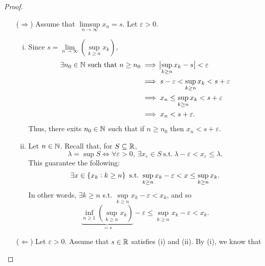 \documentclass[11pt,openany]{article}
\begin{document}
\begin{proof}
\begin{enumerate}[(1)]
\begin{center}
\end{center}
\begin{itemize}
	\item[($\Rightarrow$)] Assume that $\limsup\limits_{n \to \infty} x_n=s$. Let $\varepsilon>0$. 
	\begin{enumerate}[(i)]
		\item Since $s=\lim\limits_{n\to\infty}\left(\sup\limits_{k\geq n}x_k\right)$, 
		\begin{align*}
		\exists n_0\in\mathbb{N}\ \text{such that}\ n\geq n_0&\implies\abs[1]{\sup\limits_{k\geq n}x_k-s}<\varepsilon \\
		& \implies s-\varepsilon< \sup\limits_{k\geq n} x_k<s+\varepsilon\\
		& \implies x_n\leq\sup\limits_{k\geq n} x_k<s+\varepsilon \\
		& \implies x_n < s+\varepsilon.
		\end{align*}
		Thus, there exits $n_0\in\mathbb{N}$ such that if $n\geq n_0$ then $x_n<s+\varepsilon$.
		\newpage
		\item Let $n\in\mathbb{N}$. Recall that, for $S\subseteq\mathbb{R}$, \[
		\boxed{\lambda=\sup S\iff\forall\varepsilon>0,\ \exists x_\varepsilon\in S\ \text{s.t.}\ \lambda-\varepsilon<x_\varepsilon\leq\lambda}.
		\] This guarantee the following: \[
		\exists x\in\set{x_k:k\geq n}\ \text{s.t.}\ \sup\limits_{k\geq n}x_k-\varepsilon < x\leq\sup\limits_{k\geq n}x_k.
		\] In other words, $\exists k\geq n$ s.t. $\sup\limits_{k\geq n}x_k-\varepsilon<x_k$, and so \[
		\underbrace{\inf\limits_{n\geq 1}\left(\sup_{k\geq n}x_k\right)}_{=s}-\varepsilon\leq\sup\limits_{k\geq n}x_k-\varepsilon<x_k.
		\]
	\end{enumerate}
	\item[($\Leftarrow$)] Let $\varepsilon>0$. Assume that $s\in\mathbb{R}$ satisfies (i) and (ii). By (i), we know that \[
\]
\end{itemize}
\end{enumerate}
\end{proof}
\end{document}
